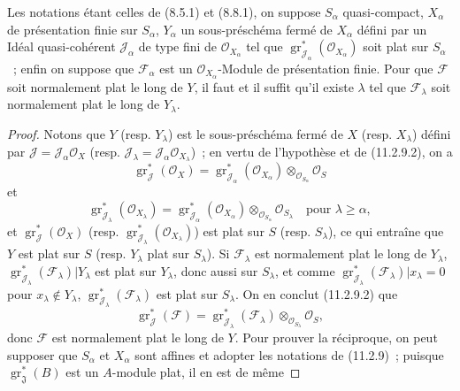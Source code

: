 \begin{proposition}[11.3.6]
\label{IV.11.3.6-fr}
Les notations étant celles de (8.5.1) et (8.8.1), on suppose $S_\alpha$
quasi-compact, $X_\alpha$ de présentation finie sur $S_\alpha$, $Y_\alpha$ un
sous-préschéma fermé de $X_\alpha$ défini par un Idéal quasi-cohérent
$\mathcal J_\alpha$ de type fini de $\mathcal O_{X_\alpha}$ tel que
$\operatorname{gr}_{\mathcal J_\alpha}^*(\mathcal O_{X_\alpha})$ soit plat sur
$S_\alpha$~; enfin on suppose que $\mathcal F_\alpha$ est un
$\mathcal O_{X_\alpha}$-Module de présentation finie. Pour que $\mathcal F$
soit normalement plat le long de $Y$, il faut et il suffit qu'il existe
$\lambda$ tel que $\mathcal F_\lambda$ soit normalement plat le long de
$Y_\lambda$.
\end{proposition}

\begin{proof}
Notons que $Y$ (resp. $Y_\lambda$) est le sous-préschéma fermé de $X$ (resp.
$X_\lambda$) défini par $\mathcal J=\mathcal J_\alpha\mathcal O_X$ (resp.
$\mathcal J_\lambda=\mathcal J_\alpha\mathcal O_{X_\lambda}$)~; en vertu de
l'hypothèse et de (11.2.9.2), on a
\[
\operatorname{gr}_{\mathcal J}^*(\mathcal O_X)
=\operatorname{gr}_{\mathcal J_\alpha}^*(\mathcal O_{X_\alpha})
 \otimes_{\mathcal O_{S_\alpha}}\mathcal O_S
\]
et
\[
\operatorname{gr}_{\mathcal J_\lambda}^*(\mathcal O_{X_\lambda})
=\operatorname{gr}_{\mathcal J_\alpha}^*(\mathcal O_{X_\alpha})
 \otimes_{\mathcal O_{S_\alpha}}\mathcal O_{S_\lambda}
\quad\text{pour }\lambda\geq\alpha,
\]
et $\operatorname{gr}_{\mathcal J}^*(\mathcal O_X)$ (resp.
$\operatorname{gr}_{\mathcal J_\lambda}^*(\mathcal O_{X_\lambda})$) est plat
sur $S$ (resp. $S_\lambda$), ce qui entraîne que $Y$ est plat sur $S$ (resp.
$Y_\lambda$ plat sur $S_\lambda$). Si $\mathcal F_\lambda$ est normalement plat
le long de $Y_\lambda$, $\operatorname{gr}_{\mathcal J_\lambda}^*
(\mathcal F_\lambda)|Y_\lambda$ est plat sur $Y_\lambda$, donc aussi sur
$S_\lambda$, et comme
$\operatorname{gr}_{\mathcal J_\lambda}^*(\mathcal F_\lambda)|x_\lambda=0$
pour $x_\lambda\notin Y_\lambda$,
$\operatorname{gr}_{\mathcal J_\lambda}^*(\mathcal F_\lambda)$ est plat sur
$S_\lambda$. On en conclut (11.2.9.2) que
\[
\operatorname{gr}_{\mathcal J}^*(\mathcal F)
=\operatorname{gr}_{\mathcal J_\lambda}^*(\mathcal F_\lambda)
 \otimes_{\mathcal O_{S_\lambda}}\mathcal O_S,
\]
donc $\mathcal F$ est normalement plat le long de $Y$. Pour prouver la
réciproque, on peut supposer que $S_\alpha$ et $X_\alpha$ sont affines et
adopter les notations de (11.2.9)~; puisque
$\operatorname{gr}_{\mathfrak J}^*(B)$ est un $A$-module plat, il en est de même

\end{proof}
